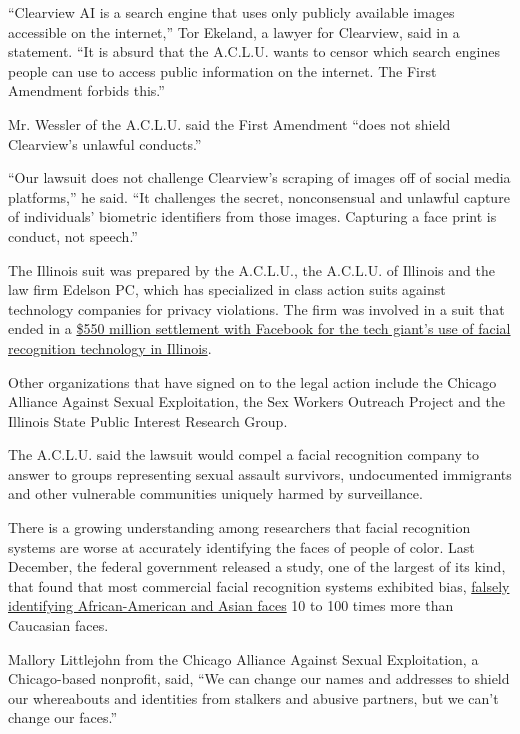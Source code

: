 ``Clearview AI is a search engine that uses only publicly available
images accessible on the internet,'' Tor Ekeland, a lawyer for
Clearview, said in a statement. ``It is absurd that the A.C.L.U. wants
to censor which search engines people can use to access public
information on the internet. The First Amendment forbids this.''

Mr. Wessler of the A.C.L.U. said the First Amendment ``does not shield
Clearview's unlawful conducts.''

``Our lawsuit does not challenge Clearview's scraping of images off of
social media platforms,'' he said. ``It challenges the secret,
nonconsensual and unlawful capture of individuals' biometric identifiers
from those images. Capturing a face print is conduct, not speech.''

The Illinois suit was prepared by the A.C.L.U., the A.C.L.U. of Illinois
and the law firm Edelson PC, which has specialized in class action suits
against technology companies for privacy violations. The firm was
involved in a suit that ended in a
\href{https://www.nytimes.com/2020/01/29/technology/facebook-privacy-lawsuit-earnings.html}{\$550
million settlement with Facebook for the tech giant's use of facial
recognition technology in Illinois}.

Other organizations that have signed on to the legal action include the
Chicago Alliance Against Sexual Exploitation, the Sex Workers Outreach
Project and the Illinois State Public Interest Research Group.

The A.C.L.U. said the lawsuit would compel a facial recognition company
to answer to groups representing sexual assault survivors, undocumented
immigrants and other vulnerable communities uniquely harmed by
surveillance.

There is a growing understanding among researchers that facial
recognition systems are worse at accurately identifying the faces of
people of color. Last December, the federal government released a study,
one of the largest of its kind, that found that most commercial facial
recognition systems exhibited bias,
\href{https://www.nytimes.com/2019/07/08/us/detroit-facial-recognition-cameras.htmlhttps://www.nytimes.com/2019/12/19/technology/facial-recognition-bias.html}{falsely
identifying African-American and Asian faces} 10 to 100 times more than
Caucasian faces.

Mallory Littlejohn from the Chicago Alliance Against Sexual
Exploitation, a Chicago-based nonprofit, said, ``We can change our names
and addresses to shield our whereabouts and identities from stalkers and
abusive partners, but we can't change our faces.''

